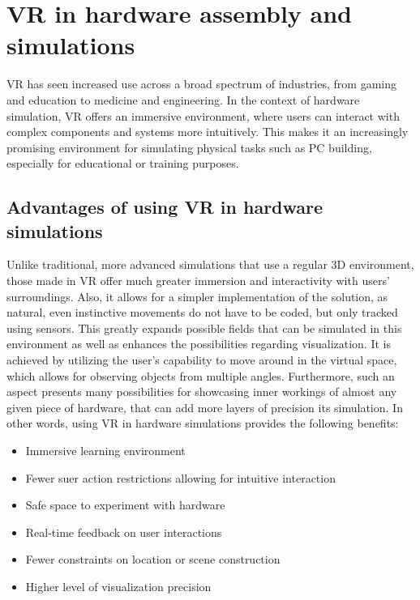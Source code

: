 \section{VR in hardware assembly and simulations}
\label{sec:VRGamesAndSimulations}

VR has seen increased use across a broad spectrum of industries, from gaming and education to medicine and engineering.
In the context of hardware simulation, VR offers an immersive environment, where users can interact with complex components and systems more intuitively.
This makes it an increasingly promising environment for simulating physical tasks such as PC building, especially for educational or training purposes.

\subsection{Advantages of using VR in hardware simulations}

Unlike traditional, more advanced simulations that use a regular 3D environment, those made in VR offer much greater immersion and interactivity with users' surroundings.
Also, it allows for a simpler implementation of the solution, as natural, even instinctive movements do not have to be coded, but only tracked using sensors.
This greatly expands possible fields that can be simulated in this environment as well as enhances the possibilities regarding visualization.
It is achieved by utilizing the user's capability to move around in the virtual space, which allows for observing objects from multiple angles.
Furthermore, such an aspect presents many possibilities for showcasing inner workings of almost any given piece of hardware, that can add more layers of precision its simulation.
In other words, using VR in hardware simulations provides the following benefits:

\begin{itemize}
    \item Immersive learning environment
    \item Fewer suer action restrictions allowing for intuitive interaction
    \item Safe space to experiment with hardware
    \item Real-time feedback on user interactions
    \item Fewer constraints on location or scene construction
    \item Higher level of visualization precision
\end{itemize}

